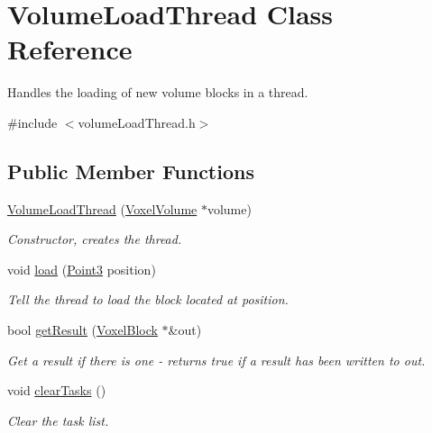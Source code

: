 \hypertarget{classVolumeLoadThread}{
\section{\-Volume\-Load\-Thread \-Class \-Reference}
\label{d0/d8a/classVolumeLoadThread}
}


\-Handles the loading of new volume blocks in a thread.  




{\ttfamily \#include $<$volume\-Load\-Thread.\-h$>$}

\subsection*{\-Public \-Member \-Functions}
\begin{DoxyCompactItemize}
\item 
\hypertarget{classVolumeLoadThread_a081f90a64fad1950dc5e0be8c4f6abb9}{
\hyperlink{classVolumeLoadThread_a081f90a64fad1950dc5e0be8c4f6abb9}{\-Volume\-Load\-Thread} (\hyperlink{classVoxelVolume}{\-Voxel\-Volume} $\ast$volume)}
\label{d0/d8a/classVolumeLoadThread_a081f90a64fad1950dc5e0be8c4f6abb9}

\begin{DoxyCompactList}\small\item\em \-Constructor, creates the thread. \end{DoxyCompactList}\item 
\hypertarget{classVolumeLoadThread_a31d0f8d19dedb82cbb119150c97b5457}{
void \hyperlink{classVolumeLoadThread_a31d0f8d19dedb82cbb119150c97b5457}{load} (\hyperlink{classPoint3}{\-Point3} position)}
\label{d0/d8a/classVolumeLoadThread_a31d0f8d19dedb82cbb119150c97b5457}

\begin{DoxyCompactList}\small\item\em \-Tell the thread to load the block located at position. \end{DoxyCompactList}\item 
\hypertarget{classVolumeLoadThread_a83c615657e19a1e9f3d23a0cf419cb1b}{
bool \hyperlink{classVolumeLoadThread_a83c615657e19a1e9f3d23a0cf419cb1b}{get\-Result} (\hyperlink{classVoxelBlock}{\-Voxel\-Block} $\ast$\&out)}
\label{d0/d8a/classVolumeLoadThread_a83c615657e19a1e9f3d23a0cf419cb1b}

\begin{DoxyCompactList}\small\item\em \-Get a result if there is one -\/ returns true if a result has been written to out. \end{DoxyCompactList}\item 
\hypertarget{classVolumeLoadThread_adc058f47d90ddce4b9f984d0a13eed46}{
void \hyperlink{classVolumeLoadThread_adc058f47d90ddce4b9f984d0a13eed46}{clear\-Tasks} ()}
\label{d0/d8a/classVolumeLoadThread_adc058f47d90ddce4b9f984d0a13eed46}

\begin{DoxyCompactList}\small\item\em \-Clear the task list. \end{DoxyCompactList}\end{DoxyCompactItemize}
